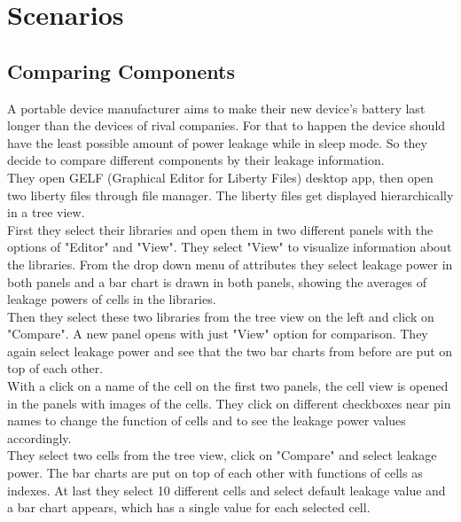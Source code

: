 \documentclass[10pt,a4paper]{report}
\begin{document}
\chapter{Scenarios}
\section{Comparing Components}
\setlength{\parindent}{0em}


A portable device manufacturer aims to make their new device's battery last longer than the devices of rival companies. For that to happen the device should have the least possible amount of power leakage while in sleep mode. So they decide to compare different components by their leakage information. 
\\

They open GELF (Graphical Editor for Liberty Files) desktop app, then open two liberty files through file manager. The liberty files get displayed hierarchically in a tree view.
\\

First they select their libraries and open them in two different panels with the options of "Editor" and "View". They select "View" to visualize information about the libraries. From the drop down menu of attributes they select leakage power in both panels and a bar chart is drawn in both panels, showing the averages of leakage powers of cells in the libraries. 
\\

Then they select these two libraries from the tree view on the left and click on "Compare". A new panel opens with just "View" option for comparison. They again select leakage power and see that the two bar charts from before are put on top of each other.
\\

With a click on a name of the cell on the first two panels, the cell view is opened in the panels with images of the cells. They click on different checkboxes near pin names to change the function of cells and to see the leakage power values accordingly.
\\

They select two cells from the tree view, click on "Compare" and select leakage power. The bar charts are put on top of each other with functions of cells as indexes. At last they select 10 different cells and select default leakage value and a bar chart appears, which has a single value for each selected cell.
\\
\end{document}

